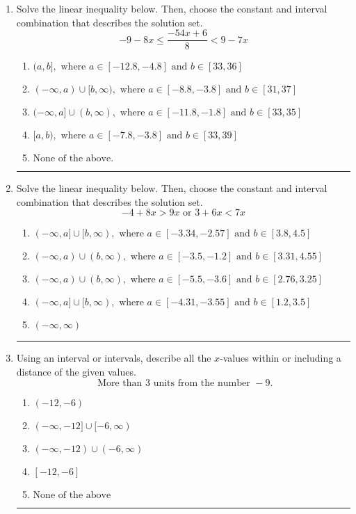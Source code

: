 \documentclass[14pt]{extbook}
\newcommand{\litem}[1]{\item#1\hspace*{-1cm}\rule{\textwidth}{0.4pt}}
\begin{document}
\begin{enumerate}
{\begin{enumerate}[label=\Alph*.]
\end{enumerate} }
\litem{
Solve the linear inequality below. Then, choose the constant and interval combination that describes the solution set.\[ -9 - 8 x \leq \frac{-54 x + 6}{8} < 9 - 7 x \]\begin{enumerate}[label=\Alph*.]
\item \( (a, b], \text{ where } a \in [-12.8, -4.8] \text{ and } b \in [33, 36] \)
\item \( (-\infty, a) \cup [b, \infty), \text{ where } a \in [-8.8, -3.8] \text{ and } b \in [31, 37] \)
\item \( (-\infty, a] \cup (b, \infty), \text{ where } a \in [-11.8, -1.8] \text{ and } b \in [33, 35] \)
\item \( [a, b), \text{ where } a \in [-7.8, -3.8] \text{ and } b \in [33, 39] \)
\item \( \text{None of the above.} \)

\end{enumerate} }
\litem{
Solve the linear inequality below. Then, choose the constant and interval combination that describes the solution set.\[ -4 + 8 x > 9 x \text{ or } 3 + 6 x < 7 x \]\begin{enumerate}[label=\Alph*.]
\item \( (-\infty, a] \cup [b, \infty), \text{ where } a \in [-3.34, -2.57] \text{ and } b \in [3.8, 4.5] \)
\item \( (-\infty, a) \cup (b, \infty), \text{ where } a \in [-3.5, -1.2] \text{ and } b \in [3.31, 4.55] \)
\item \( (-\infty, a) \cup (b, \infty), \text{ where } a \in [-5.5, -3.6] \text{ and } b \in [2.76, 3.25] \)
\item \( (-\infty, a] \cup [b, \infty), \text{ where } a \in [-4.31, -3.55] \text{ and } b \in [1.2, 3.5] \)
\item \( (-\infty, \infty) \)

\end{enumerate} }
\litem{
Using an interval or intervals, describe all the $x$-values within or including a distance of the given values.\[ \text{ More than } 3 \text{ units from the number } -9. \]\begin{enumerate}[label=\Alph*.]
\item \( (-12, -6) \)
\item \( (-\infty, -12] \cup [-6, \infty) \)
\item \( (-\infty, -12) \cup (-6, \infty) \)
\item \( [-12, -6] \)
\item \( \text{None of the above} \)


\end{enumerate}}
\end{enumerate}
\end{document}
